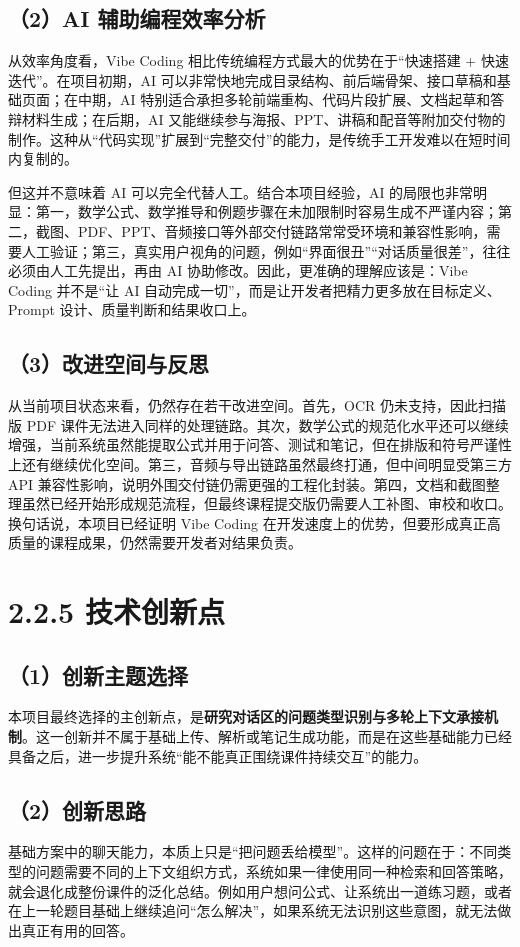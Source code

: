\documentclass[UTF8,zihao=-4]{ctexart}
\begin{document}
\subsection*{（2）AI 辅助编程效率分析}
从效率角度看，Vibe Coding 相比传统编程方式最大的优势在于“快速搭建 + 快速迭代”。在项目初期，AI 可以非常快地完成目录结构、前后端骨架、接口草稿和基础页面；在中期，AI 特别适合承担多轮前端重构、代码片段扩展、文档起草和答辩材料生成；在后期，AI 又能继续参与海报、PPT、讲稿和配音等附加交付物的制作。这种从“代码实现”扩展到“完整交付”的能力，是传统手工开发难以在短时间内复制的。

但这并不意味着 AI 可以完全代替人工。结合本项目经验，AI 的局限也非常明显：第一，数学公式、数学推导和例题步骤在未加限制时容易生成不严谨内容；第二，截图、PDF、PPT、音频接口等外部交付链路常常受环境和兼容性影响，需要人工验证；第三，真实用户视角的问题，例如“界面很丑”“对话质量很差”，往往必须由人工先提出，再由 AI 协助修改。因此，更准确的理解应该是：Vibe Coding 并不是“让 AI 自动完成一切”，而是让开发者把精力更多放在目标定义、Prompt 设计、质量判断和结果收口上。

\subsection*{（3）改进空间与反思}
从当前项目状态来看，仍然存在若干改进空间。首先，OCR 仍未支持，因此扫描版 PDF 课件无法进入同样的处理链路。其次，数学公式的规范化水平还可以继续增强，当前系统虽然能提取公式并用于问答、测试和笔记，但在排版和符号严谨性上还有继续优化空间。第三，音频与导出链路虽然最终打通，但中间明显受第三方 API 兼容性影响，说明外围交付链仍需更强的工程化封装。第四，文档和截图整理虽然已经开始形成规范流程，但最终课程提交版仍需要人工补图、审校和收口。换句话说，本项目已经证明 Vibe Coding 在开发速度上的优势，但要形成真正高质量的课程成果，仍然需要开发者对结果负责。

\section{2.2.5 技术创新点}

\subsection*{（1）创新主题选择}
本项目最终选择的主创新点，是\textbf{研究对话区的问题类型识别与多轮上下文承接机制}。这一创新并不属于基础上传、解析或笔记生成功能，而是在这些基础能力已经具备之后，进一步提升系统“能不能真正围绕课件持续交互”的能力。

\subsection*{（2）创新思路}
基础方案中的聊天能力，本质上只是“把问题丢给模型”。这样的问题在于：不同类型的问题需要不同的上下文组织方式，系统如果一律使用同一种检索和回答策略，就会退化成整份课件的泛化总结。例如用户想问公式、让系统出一道练习题，或者在上一轮题目基础上继续追问“怎么解决”，如果系统无法识别这些意图，就无法做出真正有用的回答。
\end{document}
